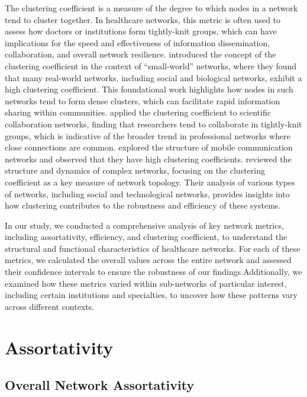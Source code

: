 \documentclass[12pt]{article}
\begin{document}
The clustering coefficient is a measure of the degree to which nodes in a network tend to cluster together. In healthcare networks, this metric is often used to assess how doctors or institutions form tightly-knit groups, which can have implications for the speed and effectiveness of information dissemination, collaboration, and overall network resilience. \citep{watts1998collective}  introduced the concept of the clustering coefficient in the context of “small-world” networks, where they found that many real-world networks, including social and biological networks, exhibit a high clustering coefficient. This foundational work highlights how nodes in such networks tend to form dense clusters, which can facilitate rapid information sharing within communities. \citep{newman2001structure} applied the clustering coefficient to scientific collaboration networks, finding that researchers tend to collaborate in tightly-knit groups, which is indicative of the broader trend in professional networks where close connections are common. \citep{onnela2007structure} explored the structure of mobile communication networks and observed that they have high clustering coefficients. \citep{boccaletti2006complex} reviewed the structure and dynamics of complex networks, focusing on the clustering coefficient as a key measure of network topology. Their analysis of various types of networks, including social and technological networks, provides insights into how clustering contributes to the robustness and efficiency of these systems.

In our study, we conducted a comprehensive analysis of key network metrics, including assortativity, efficiency, and clustering coefficient, to understand the structural and functional characteristics of healthcare networks. For each of these metrics, we calculated the overall values across the entire network and assessed their confidence intervals to ensure the robustness of our findings.Additionally, we examined how these metrics varied within sub-networks of particular interest, including certain institutions and specialties, to uncover how these patterns vary across different contexts.

\section{Assortativity}
\subsection{Overall Network Assortativity}
\end{document}
